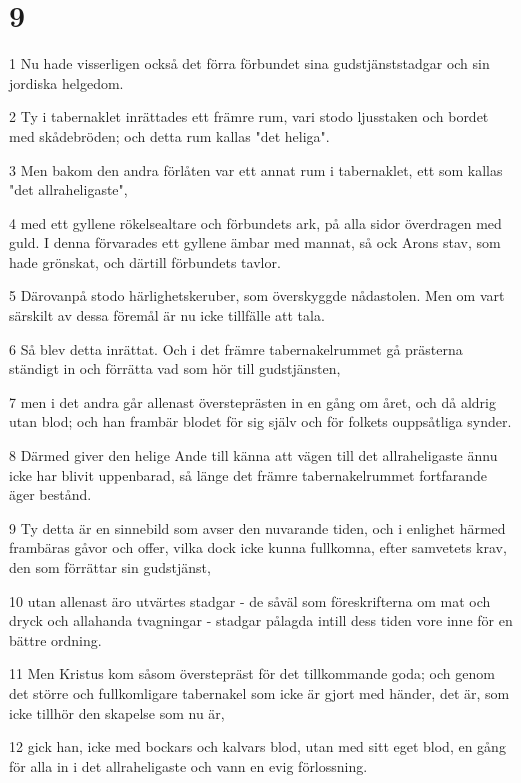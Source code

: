 \chapter{9}

\par 1 Nu hade visserligen också det förra förbundet sina gudstjänststadgar och sin jordiska helgedom.
\par 2 Ty i tabernaklet inrättades ett främre rum, vari stodo ljusstaken och bordet med skådebröden; och detta rum kallas "det heliga".
\par 3 Men bakom den andra förlåten var ett annat rum i tabernaklet, ett som kallas "det allraheligaste",
\par 4 med ett gyllene rökelsealtare och förbundets ark, på alla sidor överdragen med guld. I denna förvarades ett gyllene ämbar med mannat, så ock Arons stav, som hade grönskat, och därtill förbundets tavlor.
\par 5 Därovanpå stodo härlighetskeruber, som överskyggde nådastolen. Men om vart särskilt av dessa föremål är nu icke tillfälle att tala.
\par 6 Så blev detta inrättat. Och i det främre tabernakelrummet gå prästerna ständigt in och förrätta vad som hör till gudstjänsten,
\par 7 men i det andra går allenast översteprästen in en gång om året, och då aldrig utan blod; och han frambär blodet för sig själv och för folkets ouppsåtliga synder.
\par 8 Därmed giver den helige Ande till känna att vägen till det allraheligaste ännu icke har blivit uppenbarad, så länge det främre tabernakelrummet fortfarande äger bestånd.
\par 9 Ty detta är en sinnebild som avser den nuvarande tiden, och i enlighet härmed frambäras gåvor och offer, vilka dock icke kunna fullkomna, efter samvetets krav, den som förrättar sin gudstjänst,
\par 10 utan allenast äro utvärtes stadgar - de såväl som föreskrifterna om mat och dryck och allahanda tvagningar - stadgar pålagda intill dess tiden vore inne för en bättre ordning.
\par 11 Men Kristus kom såsom överstepräst för det tillkommande goda; och genom det större och fullkomligare tabernakel som icke är gjort med händer, det är, som icke tillhör den skapelse som nu är,
\par 12 gick han, icke med bockars och kalvars blod, utan med sitt eget blod, en gång för alla in i det allraheligaste och vann en evig förlossning.
